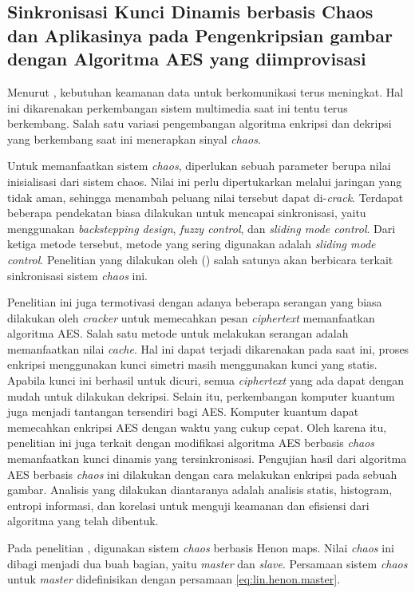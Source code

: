 \subsection{Sinkronisasi Kunci Dinamis berbasis Chaos dan Aplikasinya pada Pengenkripsian gambar dengan Algoritma AES yang diimprovisasi}

Menurut \textcite{lin2021}, kebutuhan keamanan data untuk berkomunikasi terus meningkat. Hal ini dikarenakan perkembangan sistem multimedia saat ini tentu terus berkembang. Salah satu variasi pengembangan algoritma enkripsi dan dekripsi yang berkembang saat ini menerapkan sinyal \emph{chaos}. 

Untuk memanfaatkan sistem \emph{chaos}, diperlukan sebuah parameter berupa nilai inisialisasi dari sistem chaos. Nilai ini perlu dipertukarkan melalui jaringan yang tidak aman, sehingga menambah peluang nilai tersebut dapat di-\emph{crack}. Terdapat beberapa pendekatan biasa dilakukan untuk mencapai sinkronisasi, yaitu menggunakan \emph{backstepping design}, \emph{fuzzy control}, dan \emph{sliding mode control}. Dari ketiga metode tersebut, metode yang sering digunakan adalah \emph{sliding mode control}. Penelitian yang dilakukan oleh (\cite{lin2021}) salah satunya akan berbicara terkait sinkronisasi sistem \emph{chaos} ini.

Penelitian ini juga termotivasi dengan adanya beberapa serangan yang biasa dilakukan oleh \emph{cracker} untuk memecahkan pesan \emph{ciphertext} memanfaatkan algoritma AES. Salah satu metode untuk melakukan serangan adalah memanfaatkan nilai \emph{cache}. Hal ini dapat terjadi dikarenakan pada saat ini, proses enkripsi menggunakan kunci simetri masih menggunakan kunci yang statis. Apabila kunci ini berhasil untuk dicuri, semua \emph{ciphertext} yang ada dapat dengan mudah untuk dilakukan dekripsi. Selain itu, perkembangan komputer kuantum juga menjadi tantangan tersendiri bagi AES. Komputer kuantum dapat memecahkan enkripsi AES dengan waktu yang cukup cepat. Oleh karena itu, penelitian ini juga terkait dengan modifikasi algoritma AES berbasis \emph{chaos} memanfaatkan kunci dinamis yang tersinkronisasi. Pengujian hasil dari algoritma AES berbasis \emph{chaos} ini dilakukan dengan cara melakukan enkripsi pada sebuah gambar. Analisis yang dilakukan diantaranya adalah analisis statis, histogram, entropi informasi, dan korelasi untuk menguji keamanan dan efisiensi dari algoritma yang telah dibentuk.

Pada penelitian \textcite{lin2021}, digunakan sistem \emph{chaos} berbasis Henon maps. Nilai \emph{chaos} ini dibagi menjadi dua buah bagian, yaitu \emph{master} dan \emph{slave}. Persamaan sistem \emph{chaos} untuk \emph{master} didefinisikan dengan persamaan \ref{eq:lin.henon.master}.

